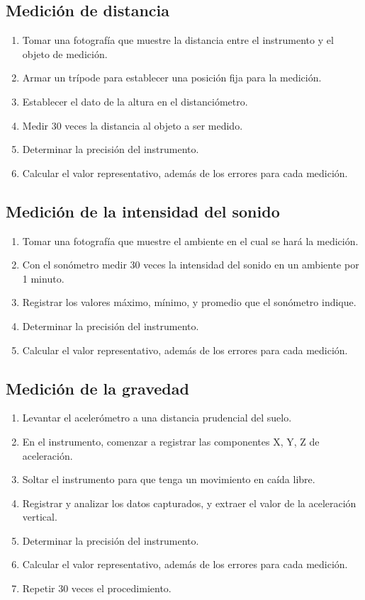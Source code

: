 \documentclass[letter,11pt]{article}
\begin{document}
\subsection{Medición de distancia}
\begin{enumerate}
\item Tomar una fotografía que muestre la distancia entre el instrumento y el
objeto de medición.
\item Armar un trípode para establecer una posición fija para la medición.
\item Establecer el dato de la altura en el distanciómetro.
\item Medir 30 veces la distancia al objeto a ser medido.
\item Determinar la precisión del instrumento.
\item Calcular el valor representativo, además de los errores para cada
medición.
\end{enumerate}

\subsection{Medición de la intensidad del sonido}
\begin{enumerate}
\item Tomar una fotografía que muestre el ambiente en el cual se hará la
medición.
\item Con el sonómetro medir 30 veces la intensidad del sonido en un ambiente
por 1 minuto.
\item Registrar los valores máximo, mínimo, y promedio que el sonómetro indique.
\item Determinar la precisión del instrumento.
\item Calcular el valor representativo, además de los errores para cada
medición.
\end{enumerate}

\subsection{Medición de la gravedad}
\begin{enumerate}
\item Levantar el acelerómetro a una distancia prudencial del suelo.
\item En el instrumento, comenzar a registrar las componentes X, Y, Z de
aceleración.
\item Soltar el instrumento para que tenga un movimiento en caída libre.
\item Registrar y analizar los datos capturados, y extraer el valor de la
aceleración vertical.
\item Determinar la precisión del instrumento.
\item Calcular el valor representativo, además de los errores para cada
medición.
\item Repetir 30 veces el procedimiento.
\end{enumerate}
\end{document}
